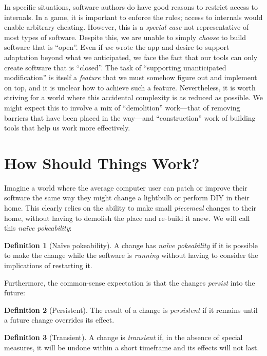 \documentclass[ twoside,openright,titlepage,numbers=noenddot,headinclude,footinclude,cleardoublepage=empty,abstract=on,
                BCOR=5mm,paper=a4,fontsize=11pt
                ]{scrreprt}
\theoremstyle{definition}
\newtheorem{defn}{Definition}
\begin{document}
In specific situations, software authors do have good reasons to
restrict access to internals. In a game, it is important to enforce the
rules; access to internals would enable arbitrary cheating. However,
this is a \emph{special case} not representative of most types of
software. Despite this, we are unable to simply \emph{choose} to build
software that is ``open''. Even if \emph{we} wrote the app and desire to
support adaptation beyond what we anticipated, we face the fact that our
tools can only create software that is ``closed''. The task of
``supporting unanticipated modification'' is itself a \emph{feature}
that we must somehow figure out and implement on top, and it is unclear
how to achieve such a feature. Nevertheless, it is worth striving for a
world where this accidental complexity is as reduced as possible. We
might expect this to involve a mix of ``demolition'' work---that of
removing barriers that have been placed in the way---and
``construction'' work of building tools that help us work more
effectively.

\hypertarget{how-should-things-work}{\section{How Should Things Work?}\label{how-should-things-work}}

Imagine a world where the average computer user can patch or improve
their software the same way they might change a lightbulb or perform DIY
in their home. This clearly relies on the ability to make small
\emph{piecemeal} changes to their home, without having to demolish the
place and re-build it anew. We will call this \emph{naïve pokeability}:

\begin{defn}[Naïve pokeability]
\label{def:naive-pokeability}
A change has \emph{naïve pokeability} if it is possible to make the change while the software is \emph{running} without having to consider the implications of restarting it.
\end{defn}

Furthermore, the common-sense expectation is that the changes
\emph{persist} into the future:

\begin{defn}[Persistent]
\label{def:persistent}
The result of a change is \emph{persistent} if it remains until a future change overrides its effect.
\end{defn}

\begin{defn}[Transient]
\label{def:transient}
A change is \emph{transient} if, in the absence of special measures, it will be undone within a short timeframe and its effects will not last.
\end{defn}
\end{document}
